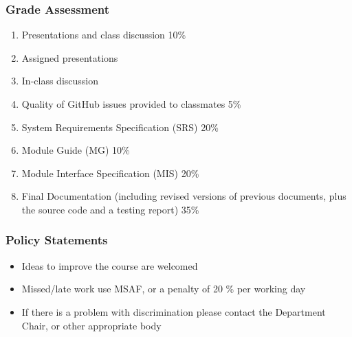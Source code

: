 \documentclass[t,12pt,numbers,fleqn]{beamer}
\begin{document}

\begin{frame}
\frametitle{Grade Assessment}

\begin {enumerate}

\item Presentations and class discussion 10\%
\bi
\item Assigned presentations
\item In-class discussion
\ei

\item Quality of GitHub issues provided to classmates 5\%

\item System Requirements Specification (SRS) 20\%

\item Module Guide (MG) 10\%

\item Module Interface Specification (MIS) 20\%

\item Final Documentation (including revised versions of previous documents,
  plus the source code and a testing report) 35\%

\end {enumerate}

\end{frame}


\begin{frame}
\frametitle{Policy Statements}

\begin {itemize}

\item Ideas to improve the course are welcomed
\item Missed/late work use MSAF, or a penalty of 20 \% per working day
\item If there is a problem with discrimination please contact the Department
  Chair, or other appropriate body

\end{itemize}

\end{frame}

\end{document}
